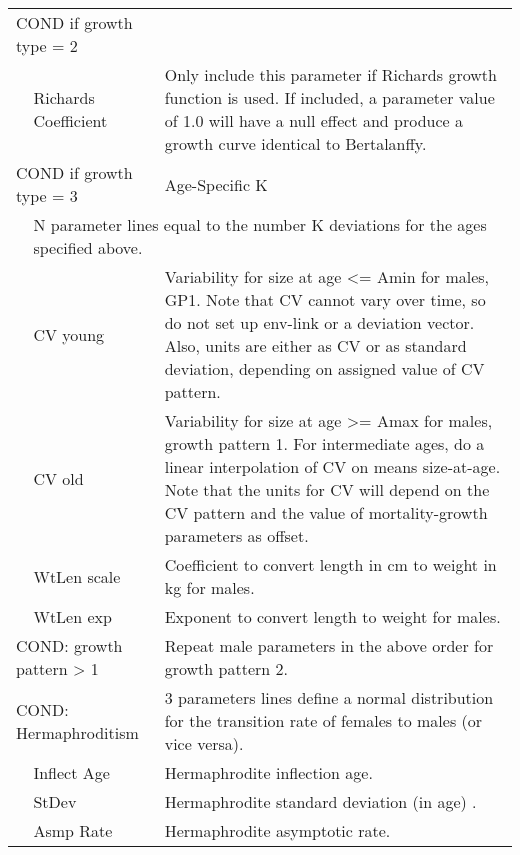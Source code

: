 \begin{longtable}{p{1cm} p{2.25cm} p{10cm}}
	\multicolumn{2}{l}{COND if growth type = 2 } & \Tstrut\\
	& Richards Coefficient & Only include this parameter if Richards growth function is used.  If included, a parameter value of 1.0 will have a null effect and produce a growth curve identical to Bertalanffy.\\
	\multicolumn{2}{l}{COND if growth type = 3 } & Age-Specific K \\
	& \multicolumn{2}{l}{N parameter lines equal to the number K deviations for the ages specified above.}\Bstrut\\
	\hline

	\Tstrut & CV young & Variability for size at age <= Amin for males, GP1.  Note that CV cannot vary over time, so do not set up env-link or a deviation vector.  Also, units are either as CV or as standard deviation, depending on assigned value of CV pattern.\\
	& CV old &  Variability for size at age >= Amax for males, growth pattern 1. For intermediate ages, do a linear interpolation of CV on means size-at-age.  Note that the units for CV will depend on the CV pattern and the value of mortality-growth parameters as offset.\\
	\hline

	\Tstrut & WtLen scale & Coefficient to convert length in cm to weight in kg for males.\\
    & WtLen exp & Exponent to convert length to weight for males.\Bstrut\\

	\multicolumn{2}{l}{COND: growth pattern > 1} \Tstrut & Repeat male parameters in the above order for growth pattern 2.\\
	\hline

	\multicolumn{2}{l}{COND: Hermaphroditism} \Tstrut & 3 parameters lines define a normal distribution for the transition rate of females to males (or vice versa).\\
	& Inflect Age & Hermaphrodite inflection age.\\
	& StDev & Hermaphrodite standard deviation (in age) .\\
	& Asmp Rate & Hermaphrodite asymptotic rate.\Bstrut\\
	\hline


\end{longtable}
